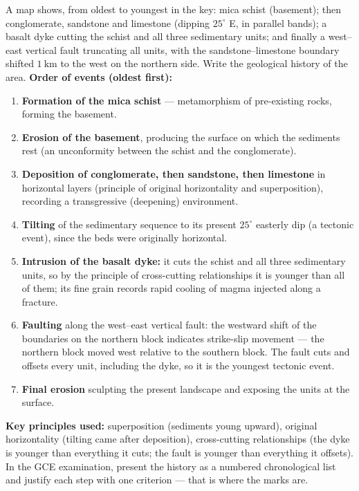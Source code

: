 \documentclass[11pt]{article}
\newcommand{\cle}[1]{{\popxbold\color{popdark}#1}}
\begin{document}
\begin{exoresolu}
A map shows, from oldest to youngest in the key: mica schist (basement); then conglomerate, sandstone and limestone (dipping $25^{\circ}$ E, in parallel bands); a basalt dyke cutting the schist and all three sedimentary units; and finally a west--east vertical fault truncating all units, with the sandstone--limestone boundary shifted $1\ \mathrm{km}$ to the west on the northern side. Write the geological history of the area.
\tcblower
\textbf{Order of events (oldest first):}
\begin{enumerate}
\item \textbf{Formation of the mica schist} — metamorphism of pre-existing rocks, forming the basement.
\item \textbf{Erosion of the basement}, producing the surface on which the sediments rest (an unconformity between the schist and the conglomerate).
\item \textbf{Deposition of conglomerate, then sandstone, then limestone} in horizontal layers (principle of original horizontality and superposition), recording a transgressive (deepening) environment.
\item \textbf{Tilting} of the sedimentary sequence to its present $25^{\circ}$ easterly dip (a tectonic event), since the beds were originally horizontal.
\item \textbf{Intrusion of the basalt dyke:} it cuts the schist and all three sedimentary units, so by the principle of \cle{cross-cutting relationships} it is younger than all of them; its fine grain records rapid cooling of magma injected along a fracture.
\item \textbf{Faulting} along the west--east vertical fault: the westward shift of the boundaries on the northern block indicates \cle{strike-slip movement} — the northern block moved west relative to the southern block. The fault cuts and offsets every unit, including the dyke, so it is the youngest tectonic event.
\item \textbf{Final erosion} sculpting the present landscape and exposing the units at the surface.
\end{enumerate}
\textbf{Key principles used:} superposition (sediments young upward), original horizontality (tilting came after deposition), cross-cutting relationships (the dyke is younger than everything it cuts; the fault is younger than everything it offsets). In the GCE examination, present the history as a numbered chronological list and justify each step with one criterion — that is where the marks are.
\end{exoresolu}
\end{document}
